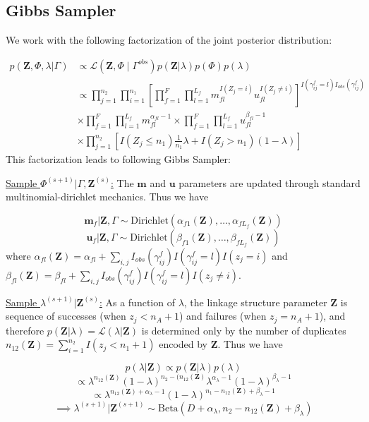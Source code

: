 \documentclass[12pt,letterpaper]{article}
\newcommand{\1}[1]{\mathbb{I}\!\left[#1\right]} %
\begin{document}
{\hypertarget{posterior-sampling}{%
	\subsection{Gibbs Sampler}
	\label{gibbs_sampling}}
We work with the following factorization of the joint posterior distribution:

\begin{align*}
	p(\mathbf{Z}, \Phi, \lambda|\Gamma) &\propto \mathcal{L}(\bm{Z}, \Phi \mid \Gamma^{obs}) p(\mathbf{Z} | \lambda) p(\Phi) p(\lambda) \\
	&\propto \prod_{j=1}^{n_2}  \prod_{i=1}^{n_1}\left[ \prod_{f=1}^{F}\prod_{l=1}^{L_f} m_{fl}^{I(Z_j = i)}u_{fl}^{I(Z_j \neq i)}\right]^{I(\gamma_{ij}^f = l)I_{obs}(\gamma_{ij}^f)} \\
	&\times  \prod_{f=1}^{F}\prod_{l=1}^{L_f} m_{fl}^{\alpha_{fl} - 1}  \times\prod_{f=1}^{F}\prod_{l=1}^{L_f} u_{fl}^{\beta_{fl} - 1} \\
	&\times \prod_{j=1}^{n_2} \left[I(Z_j \leq n_1)\frac{1}{n_1}\lambda + I(Z_j > n_1)(1 - \lambda)\right]
\end{align*}
This factorization leads to following Gibbs Sampler:

\underline{Sample $\Phi^{(s+1)}|\Gamma, \mathbf{Z}^{(s)}$:}
The \(\mathbf{m}\) and \(\mathbf{u}\) parameters are updated through
standard multinomial-dirichlet mechanics. Thus we have

\[\mathbf{m}_f|\mathbf{Z}, \Gamma \sim \text{Dirichlet}(\alpha_{f1}(\mathbf{Z}), \ldots, \alpha_{fL_f}(\mathbf{Z}))\]
\[\mathbf{u}_f|\mathbf{Z}, \Gamma \sim \text{Dirichlet}(\beta_{f1}(\mathbf{Z}), \ldots, \beta_{fL_f}(\mathbf{Z}))\]
where
\(\alpha_{fl}(\mathbf{Z})= \alpha_{fl} + \sum_{i,j} I_{obs}(\gamma_{ij}^f)I(\gamma_{ij}^f = l) I(z_j = i)\)
and
\(\beta_{fl}(\mathbf{Z})= \beta_{fl} + \sum_{i,j} I_{obs}(\gamma_{ij}^f)I(\gamma_{ij}^f = l) I(z_j \neq i)\).

\underline{Sample $\lambda^{(s+1)}|\mathbf{Z}^{(s)}$:} As a function of
\(\lambda\), the linkage structure parameter \(\mathbf{Z}\) is sequence
of successes (when \(z_j < n_A + 1\)) and failures (when
\(z_j = n_A + 1\)), and therefore
\(p(\mathbf{Z}|\lambda) = \mathcal{L}(\lambda|\mathbf{Z})\) is
determined only by the number of duplicates
$n_{12}(\mathbf{Z}) = \sum_{i=1}^{n_2}I(z_j < n_1 + 1)$ encoded by
$\mathbf{Z}$. Thus we have

\[p(\lambda | \mathbf{Z}) \propto p(\mathbf{Z}|\lambda)p(\lambda)\]
\[\propto \lambda^{n_{12}(\mathbf{Z})} (1-\lambda)^{n_2 - (n_{12}(\mathbf{Z})} \lambda^{\alpha_{\lambda} -1} (1-\lambda)^{\beta_{\lambda} -1}\]
\[ \propto \lambda^{n_{12}(\mathbf{Z}) + \alpha_{\lambda} - 1} (1-\lambda)^{n_1 - n_{12}(\mathbf{Z}) + \beta_{\lambda} -1}\]
\[\implies \lambda^{(s+1)}|\mathbf{Z}^{(s+1)} \sim \text{Beta}(D + \alpha_{\lambda}, n_2 - n_{12}(\mathbf{Z}) + \beta_{\lambda})\]

}
\end{document}
